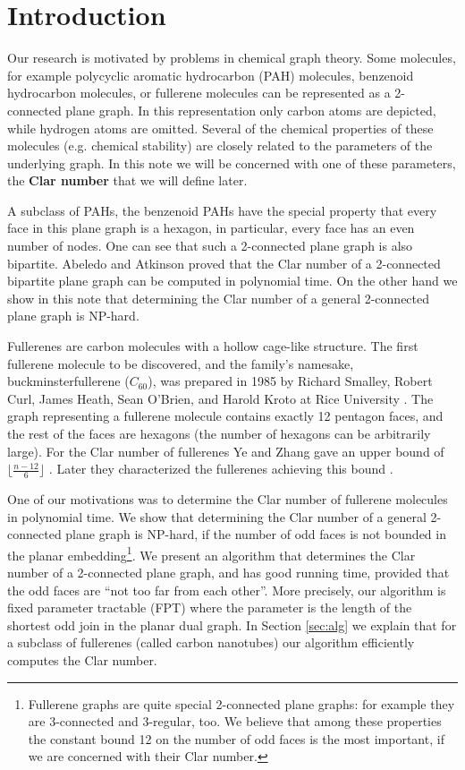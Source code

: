 \documentclass{article}
\begin{document}
\section{Introduction} 


Our research is motivated by problems in chemical graph theory. Some
molecules, for example polycyclic aromatic hydrocarbon (PAH) molecules,
benzenoid hydrocarbon molecules, or fullerene molecules can be
represented as a 2-connected plane graph. In this representation only carbon atoms are depicted, while hydrogen atoms are omitted. 
Several of the chemical properties of these molecules (e.g. chemical stability) are closely related to the parameters of the underlying graph. In this note we will be concerned with one of these parameters, the \textbf{Clar number} that we will define later.


A subclass of PAHs, the benzenoid PAHs have the special property that every
face in this plane graph is a hexagon, in particular, every face has an even
number of nodes. One can see that such a 2-connected plane graph is
also bipartite. Abeledo and Atkinson proved that the Clar number of a
2-connected bipartite plane graph can be computed in polynomial
time. On the other hand we show in this note that determining the Clar
number of a general 2-connected plane graph is NP-hard.

Fullerenes are carbon molecules with a hollow cage-like structure.
The first fullerene molecule to be discovered, and the family's
namesake, buckminsterfullerene ($C_{60}$), was prepared in 1985 by
Richard Smalley, Robert Curl, James Heath, Sean O'Brien, and Harold
Kroto at Rice University \cite{kroto1985c}. The graph representing a fullerene molecule
contains exactly 12 pentagon faces, and the rest of the faces are
hexagons (the number of hexagons can be arbitrarily large). 
For the Clar number of fullerenes Ye and Zhang gave an upper bound of $\lfloor \frac{n-12}{6}\rfloor$ \cite{zhang2007upper}.
Later they characterized the fullerenes achieving this bound \cite{ye2009extremal}.


One of our
motivations was to determine the Clar number of fullerene molecules in
polynomial time. 
We show that
determining the Clar number of a general 2-connected plane graph is
NP-hard, if the number of odd faces is not bounded in the planar
embedding\footnote{Fullerene graphs are quite special 2-connected plane graphs: for example they are 3-connected and  3-regular, too. We believe that among these properties the constant bound 12 on the number of odd faces is the most important, if we are concerned with their Clar number.}. 
We present an algorithm that determines the Clar number of a
2-connected plane graph, and has good running time, provided that the
odd faces are ``not too far from each other''. More precisely, our
algorithm is fixed parameter tractable (FPT) where the parameter is
the length of the shortest odd join in the planar dual graph. In
Section \ref{sec:alg} we explain that for a subclass of fullerenes
(called carbon nanotubes) our algorithm efficiently computes the Clar
number.
\end{document}
